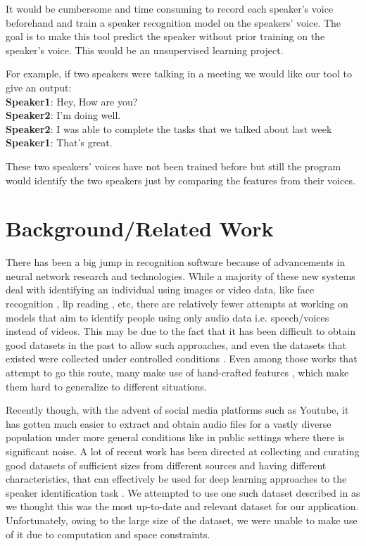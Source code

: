 \documentclass[10pt,twocolumn,letterpaper]{article}
\begin{document}
It would be cumbersome and time consuming to record each speaker’s voice beforehand and train a speaker recognition model on the speakers’ voice. The goal is to make this tool predict the speaker without prior training on the speaker’s voice. This would be an unsupervised learning project. 

For example, if two speakers were talking in a meeting we would like our tool to give an output: 
\\ {\bf Speaker1}: Hey, How are you? 
\\ {\bf Speaker2}: I’m doing well.
\\ {\bf Speaker2}: I was able to complete the tasks that we talked about last week
\\ {\bf Speaker1}: That’s great.

These two speakers’ voices have not been trained before but still the program would identify the two speakers just by comparing the features from their voices. 

\section{Background/Related Work}

There has been a big jump in recognition software because of advancements in neural network research and technologies. While a majority of these new systems deal with identifying an individual using images or video data, like face recognition \cite{face1} \cite{face2}, lip reading \cite{lip}, etc, there are relatively fewer attempts at working on models that aim to identify people using only audio data i.e. speech/voices instead of videos. This may be due to the fact that it has been difficult to obtain good datasets in the past to allow such approaches, and even the datasets that existed were collected under controlled conditions \cite{tele}\cite{aussie}. Even among those works that attempt to go this route, many make use of hand-crafted features \cite{traditional}\cite{plda}, which make them hard to generalize to different situations. 

Recently though, with the advent of social media platforms such as Youtube, it has gotten much easier to extract and obtain audio files for a vastly diverse population under more general conditions like in public settings where there is significant noise. A lot of recent work has been directed at collecting and curating good datasets of sufficient sizes from different sources and having different characteristics, that can effectively be used for deep learning approaches to the speaker identification task \cite{Nagrani_2017} \cite{McLaren2016TheSI}. We attempted to use one such dataset described in \cite{base} as we thought this was the most up-to-date and relevant dataset for our application. Unfortunately, owing to the large size of the dataset, we were unable to make use of it due to computation and space constraints.
\end{document}

